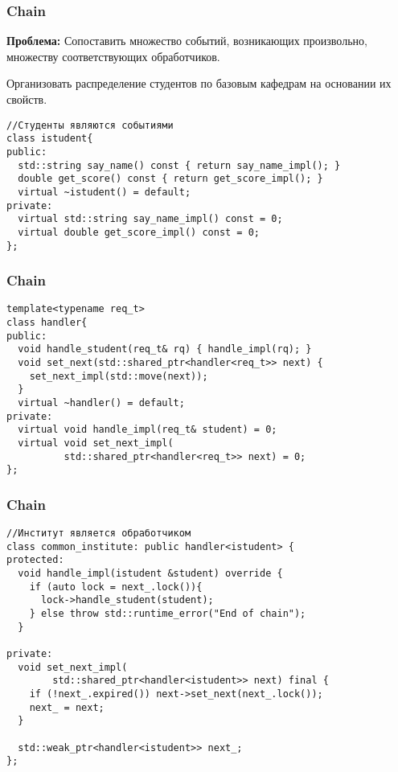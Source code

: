 \begin{frame}[fragile]
  \frametitle{Chain}
  \textbf{Проблема:} Сопоставить множество событий, возникающих произвольно, множеству соответствующих обработчиков. 
  
  \vspace{10pt}
  Организовать распределение студентов по базовым кафедрам на основании их свойств.
  
  \begin{verbatim}
//Студенты являются событиями
class istudent{
public:
  std::string say_name() const { return say_name_impl(); }
  double get_score() const { return get_score_impl(); }
  virtual ~istudent() = default;
private:
  virtual std::string say_name_impl() const = 0;
  virtual double get_score_impl() const = 0;
};
  \end{verbatim}
\end{frame}

\begin{frame}[fragile]
  \frametitle{Chain}
  \begin{verbatim}
template<typename req_t>
class handler{
public:
  void handle_student(req_t& rq) { handle_impl(rq); }
  void set_next(std::shared_ptr<handler<req_t>> next) { 
    set_next_impl(std::move(next));
  }
  virtual ~handler() = default;
private:
  virtual void handle_impl(req_t& student) = 0;
  virtual void set_next_impl(
          std::shared_ptr<handler<req_t>> next) = 0;
};
  \end{verbatim}
\end{frame}

\begin{frame}[fragile]
  \frametitle{Chain}
  \begin{verbatim}
//Институт является обработчиком
class common_institute: public handler<istudent> {
protected:
  void handle_impl(istudent &student) override {
    if (auto lock = next_.lock()){
      lock->handle_student(student);
    } else throw std::runtime_error("End of chain");
  }

private:
  void set_next_impl(
        std::shared_ptr<handler<istudent>> next) final {
    if (!next_.expired()) next->set_next(next_.lock()); 
    next_ = next;
  }
  
  std::weak_ptr<handler<istudent>> next_;
};
  \end{verbatim}
\end{frame}

